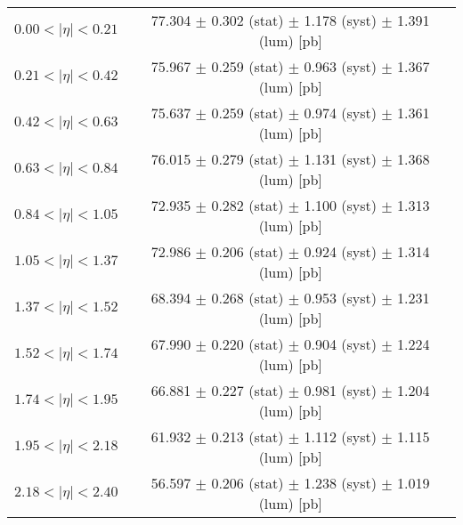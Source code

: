 \begin{tabular}{lc}
\hline
$0.00 < |\eta| <0.21$          & 77.304 $\pm$ 0.302 (stat) $\pm$ 1.178 (syst) $\pm$ 1.391 (lum) [pb]  \\
$0.21 < |\eta| <0.42$          & 75.967 $\pm$ 0.259 (stat) $\pm$ 0.963 (syst) $\pm$ 1.367 (lum) [pb]  \\
$0.42 < |\eta| <0.63$          & 75.637 $\pm$ 0.259 (stat) $\pm$ 0.974 (syst) $\pm$ 1.361 (lum) [pb]  \\
$0.63 < |\eta| <0.84$          & 76.015 $\pm$ 0.279 (stat) $\pm$ 1.131 (syst) $\pm$ 1.368 (lum) [pb]  \\
$0.84 < |\eta| <1.05$          & 72.935 $\pm$ 0.282 (stat) $\pm$ 1.100 (syst) $\pm$ 1.313 (lum) [pb]  \\
$1.05 < |\eta| <1.37$          & 72.986 $\pm$ 0.206 (stat) $\pm$ 0.924 (syst) $\pm$ 1.314 (lum) [pb]  \\
$1.37 < |\eta| <1.52$          & 68.394 $\pm$ 0.268 (stat) $\pm$ 0.953 (syst) $\pm$ 1.231 (lum) [pb]  \\
$1.52 < |\eta| <1.74$          & 67.990 $\pm$ 0.220 (stat) $\pm$ 0.904 (syst) $\pm$ 1.224 (lum) [pb]  \\
$1.74 < |\eta| <1.95$          & 66.881 $\pm$ 0.227 (stat) $\pm$ 0.981 (syst) $\pm$ 1.204 (lum) [pb]  \\
$1.95 < |\eta| <2.18$          & 61.932 $\pm$ 0.213 (stat) $\pm$ 1.112 (syst) $\pm$ 1.115 (lum) [pb]  \\
$2.18 < |\eta| <2.40$          & 56.597 $\pm$ 0.206 (stat) $\pm$ 1.238 (syst) $\pm$ 1.019 (lum) [pb]  \\
\hline
\end{tabular}
